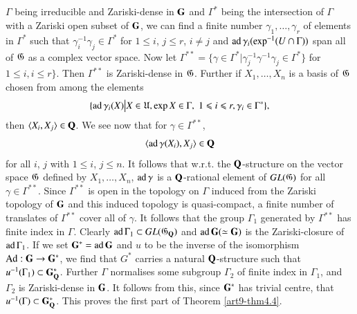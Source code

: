 \subsection{}\label{subsec4.40}
$\Gamma$ being irreducible and Zariski-dense in $\mathbf{G}$ and $\Gamma^\ast$ being the intersection of $\Gamma$ with a Zariski open subset of $\mathbf{G}$, we can find a finite number $\gamma_1 , \ldots, \gamma_r$ of elements in $\Gamma^\ast$ such that $\gamma^{-1}_i \gamma_j \in \Gamma^\ast$ for $1 \leqslant i$, $j \leqslant r$, $i \neq j$ and $\operatorname{ad} \gamma_i (\exp^{-1} (U \cap \Gamma))$ span all of $\mathfrak{G}$  as a complex vector space. Now let $\Gamma^{\ast\ast} = \{\gamma \in \Gamma^\ast \big| \gamma^{-1}_j \gamma^{-1} \gamma_j \in \Gamma^\ast\}$ for $1 \leqslant i, i \leqslant r \}$. Then $\Gamma^{\ast\ast}$  is Zariski-dense in $\mathfrak{G}$. Further if $X_1, \ldots, X_n$ is a basis of $\mathfrak{G}$ chosen from among the elements 
$$
\{\operatorname{ad} \gamma_i (X) \big| X \in \mathfrak{U}, \exp X \in \Gamma, \; 1 \leqslant i \leqslant r, \gamma_i \in \Gamma^\ast\},
$$
then $\langle X_i, X_j\rangle \in \mathbf{Q}$. We see now that for $\gamma \in \Gamma^{\ast\ast}$,
$$
\langle \operatorname{ad} \gamma (X_i), X_j\rangle  \in \mathbf{Q}
$$
for all $i$, $j$ with $1 \leqslant i $, $j \leqslant n$. It follows that w.r.t. the $\mathbf{Q}$-structure on the vector space $\mathfrak{G}$ defined by $X_1, \ldots, X_n$, $\operatorname{ad} \gamma$ is a $\mathbf{Q}$-rational element of $GL(\mathfrak{G})$ for all $\gamma \in \Gamma^{\ast\ast}$. Since $\Gamma^{\ast\ast}$ is open in the topology on $\Gamma$ induced from the Zariski topology of $\mathbf{G}$ and this induced topology is quasi-compact, a finite number of translates of $\Gamma^{\ast\ast}$ cover all of $\gamma$. It follows that the group $\Gamma_1$ generated by $\Gamma^{\ast\ast}$ has finite index in $\Gamma$. Clearly $\operatorname{ad} \Gamma_1 \subset G L (\mathfrak{G}_{\mathbf{Q}})$ and $\operatorname{ad} \mathbf{G} (\simeq \mathbf{G})$ is the Zariski-closure of $\operatorname{ad} \Gamma_1$. If we set $\mathbf{G}^\ast = \operatorname{ad} \mathbf{G}$ and $u$ to be the inverse of the isomorphism $\operatorname{Ad} : \mathbf{G} \to \mathbf{G}^\ast$, we find that $G^\ast$ carries a natural $\mathbf{Q}$-structure such that $u^{-1} (\Gamma_1) \subset \mathbf{G}^\ast_{\mathbf{Q}}$. Further $\Gamma$ normalises some subgroup $\Gamma_2$ of finite index in $\Gamma_1$, and $\Gamma_2$ is Zariski-dense in $\mathbf{G}$. It follows from this, since $\mathbf{G}^\ast$ has trivial centre, that $u^{-1} (\Gamma) \subset \mathbf{G}^\ast_{\mathbf{Q}}$. This proves the first part of Theorem \ref{art9-thm4.4}.

